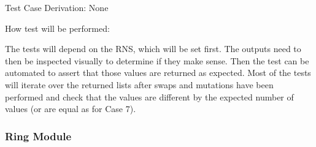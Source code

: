 \documentclass[12pt, titlepage]{article}
\begin{document}
\begin{enumerate}
Test Case Derivation: None

How test will be performed:

The tests will depend on the RNS, which will be set first. The outputs need to 
then be inspected visually to determine if they make sense. Then the test can 
be automated to assert that those values are returned as expected. Most of the 
tests will iterate over the returned lists after swaps and mutations have been 
performed and check that the values are different by the expected number of 
values (or are equal as for Case 7).

\end{enumerate}

\subsubsection{Ring Module}

\end{document}
